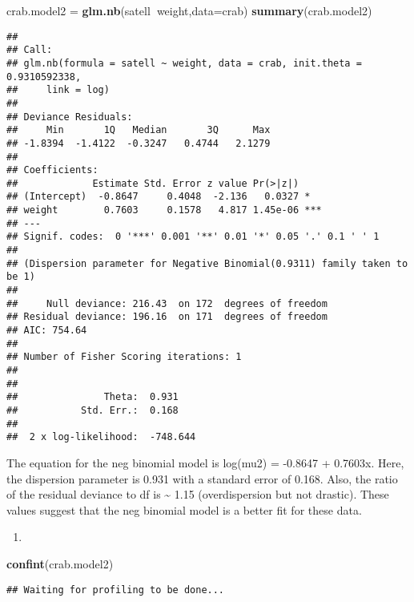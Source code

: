 \documentclass[
]{article}
\newenvironment{Shaded}{\begin{snugshade}}{\end{snugshade}}
\newcommand{\DataTypeTok}[1]{\textcolor[rgb]{0.13,0.29,0.53}{#1}}
\newcommand{\KeywordTok}[1]{\textcolor[rgb]{0.13,0.29,0.53}{\textbf{#1}}}
\newcommand{\NormalTok}[1]{#1}
\newcommand{\OperatorTok}[1]{\textcolor[rgb]{0.81,0.36,0.00}{\textbf{#1}}}
\newcommand{\StringTok}[1]{\textcolor[rgb]{0.31,0.60,0.02}{#1}}
\begin{document}
\begin{Shaded}
\begin{Highlighting}[]
\NormalTok{crab.model2 =}\StringTok{ }\KeywordTok{glm.nb}\NormalTok{(satell}\OperatorTok{~}\NormalTok{weight,}\DataTypeTok{data=}\NormalTok{crab)}
\KeywordTok{summary}\NormalTok{(crab.model2)}
\end{Highlighting}
\end{Shaded}

\begin{verbatim}
## 
## Call:
## glm.nb(formula = satell ~ weight, data = crab, init.theta = 0.9310592338, 
##     link = log)
## 
## Deviance Residuals: 
##     Min       1Q   Median       3Q      Max  
## -1.8394  -1.4122  -0.3247   0.4744   2.1279  
## 
## Coefficients:
##             Estimate Std. Error z value Pr(>|z|)    
## (Intercept)  -0.8647     0.4048  -2.136   0.0327 *  
## weight        0.7603     0.1578   4.817 1.45e-06 ***
## ---
## Signif. codes:  0 '***' 0.001 '**' 0.01 '*' 0.05 '.' 0.1 ' ' 1
## 
## (Dispersion parameter for Negative Binomial(0.9311) family taken to be 1)
## 
##     Null deviance: 216.43  on 172  degrees of freedom
## Residual deviance: 196.16  on 171  degrees of freedom
## AIC: 754.64
## 
## Number of Fisher Scoring iterations: 1
## 
## 
##               Theta:  0.931 
##           Std. Err.:  0.168 
## 
##  2 x log-likelihood:  -748.644
\end{verbatim}

The equation for the neg binomial model is log(mu2) = -0.8647 + 0.7603x.
Here, the dispersion parameter is 0.931 with a standard error of 0.168.
Also, the ratio of the residual deviance to df is \textasciitilde{} 1.15
(overdispersion but not drastic). These values suggest that the neg
binomial model is a better fit for these data.

\begin{enumerate}
\def\labelenumi{\alph{enumi})}
\setcounter{enumi}{1}
\item
\end{enumerate}

\begin{Shaded}
\begin{Highlighting}[]
\KeywordTok{confint}\NormalTok{(crab.model2)}
\end{Highlighting}
\end{Shaded}

\begin{verbatim}
## Waiting for profiling to be done...
\end{verbatim}
\end{document}
